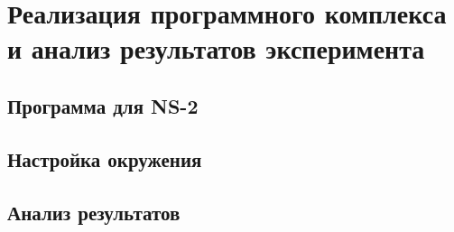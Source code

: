 \chapter{Реализация программного комплекса и анализ результатов эксперимента}

\section{Программа для NS-2}



\section{Настройка окружения}



\section{Анализ результатов}


